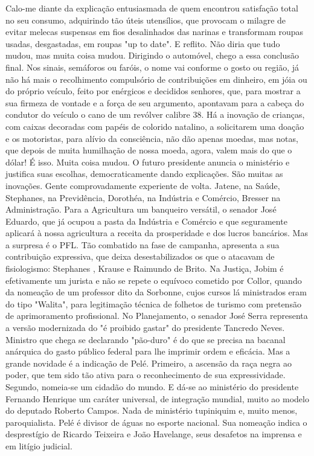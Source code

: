 Calo-me diante da explicação entusiasmada de quem encontrou satisfação total no seu consumo, adquirindo tão úteis utensílios, que provocam o milagre de evitar melecas suspensas em fios desalinhados das narinas e transformam roupas usadas, desgastadas, em roupas "up to date".
E reflito. Não diria que tudo mudou, mas muita coisa mudou. Dirigindo o automóvel, chego a essa conclusão final. Nos sinais, semáforos ou faróis, o nome vai conforme o gosto ou região, já não há mais o recolhimento compulsório de contribuições em dinheiro, em jóia ou do próprio veículo, feito por enérgicos e decididos senhores, que, para mostrar a sua firmeza de vontade e a força de seu argumento, apontavam para a cabeça do condutor do veículo o cano de um revólver calibre 38.
Há a inovação de crianças, com caixas decoradas com papéis de colorido natalino, a solicitarem uma doação e os motoristas, para alívio da consciência, não dão apenas moedas, mas notas, que depois de muita humilhação de nossa moeda, agora, valem mais do que o dólar! É isso. Muita coisa mudou.
O futuro presidente anuncia o ministério e justifica suas escolhas, democraticamente dando explicações. São muitas as inovações. Gente comprovadamente experiente de volta. Jatene, na Saúde, Stephanes, na Previdência, Dorothéa, na Indústria e Comércio, Bresser na Administração. Para a Agricultura um banqueiro versátil, o senador José Eduardo, que já ocupou a pasta da Indústria e Comércio e que seguramente aplicará à nossa agricultura a receita da prosperidade e dos lucros bancários. Mas a surpresa é o PFL. Tão combatido na fase de campanha, apresenta a sua contribuição expressiva, que deixa desestabilizados os que o atacavam de fisiologismo: Stephanes , Krause e Raimundo de Brito. Na Justiça, Jobim é efetivamente um jurista e não se repete o equívoco cometido por Collor, quando da nomeação de um professor dito da Sorbonne, cujos cursos lá ministrados eram do tipo "Walita", para legitimação técnica de folhetos de turismo com pretensão de aprimoramento profissional. No Planejamento, o senador José Serra representa a versão modernizada do "é proibido gastar" do presidente Tancredo Neves. Ministro que chega se declarando "pão-duro" é do que se precisa na bacanal anárquica do gasto público federal para lhe imprimir ordem e eficácia.
Mas a grande novidade é a indicação de Pelé. Primeiro, a ascensão da raça negra ao poder, que tem sido tão ativa para o reconhecimento de sua expressividade. Segundo, nomeia-se um cidadão do mundo. E dá-se ao ministério do presidente Fernando Henrique um caráter universal, de integração mundial, muito ao modelo do deputado Roberto Campos. Nada de ministério tupiniquim e, muito menos, paroquialista. Pelé é divisor de águas no esporte nacional. Sua nomeação indica o desprestígio de Ricardo Teixeira e João Havelange, seus desafetos na imprensa e em litígio judicial.

